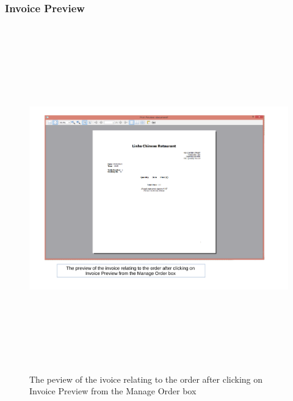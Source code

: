 \begin{landscape}
\subsubsection{Invoice Preview}
\begin{figure}[H]
    \includegraphics[height = 15cm]{./Maintenance/images/screen13}
    \caption{The peview of the ivoice relating to the order after clicking on Invoice Preview from the Manage Order box} \label{fig:screen13}
\end{figure}


\end{landscape}
